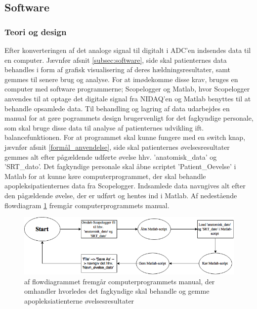\subsection{Software}
\subsubsection{Teori og design}
Efter konverteringen af det analoge signal til digitalt i ADC’en indsendes data til en computer. Jævnfør afsnit \ref{subsec:software}, side \pageref{subsec:software} skal patienternes data behandles i form af grafisk visualisering af deres hældningsresultater, samt gemmes til senere brug og analyse. For at imødekomme disse krav, bruges en computer med software programmerne; Scopelogger og Matlab, hvor Scopelogger anvendes til at optage det  digitale signal fra NIDAQ'en og Matlab benyttes til at behandle opsamlede data. Til behandling og lagring af data udarbejdes en manual for at gøre pogrammets design brugervenligt for det fagkyndige personale, som skal bruge disse data til analyse af patienternes udvikling ift. balancefunktionen. For at programmet skal kunne fungere med en switch knap, jævnfør afsnit \ref{formål_anvendelse}, side \pageref{formål_anvendelse} skal patienternes øvelsesresultater gemmes alt efter pågældende udførte øvelse hhv. 'anatomisk_data' og 'SRT_dato'. 
Det fagkyndige personale skal åbne scriptet 'Patient_Oevelse' i Matlab for at kunne køre computerprogrammet, der skal behandle apopleksipatienternes data fra Scopelogger. Indsamlede data navngives alt efter den pågældende øvelse, der er udført og hentes ind i Matlab. Af nedestående flowdiagram \ref{Flow_manual} fremgår computerprogrammets manual.

\begin{figure}[H] 
	\centering 
	\includegraphics[scale=0.5]{figures/cProblemloesning/Flow_manual.PNG}
	\caption{af flowdiagrammet fremgår computerprogrammets manual, der omhandler hvorledes det fagkyndige skal behandle og gemme apopleksiatienterne øvelsesresultater}
	\label{Flow_manual}
\end{figure} 

